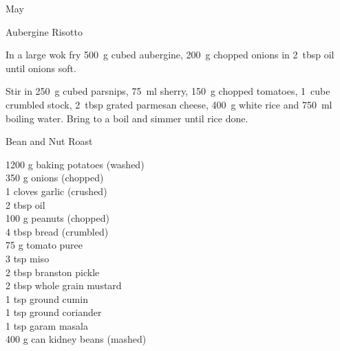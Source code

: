 \begin{menu}{May}
\begin{recipe}{2}{Aubergine Risotto}
\begin{ingredients}
		\end{ingredients}
	
	
    \begin{instructions}
    \item 
        In a large wok fry
        500~g cubed aubergine,
        200~g chopped onions
        in
        2~tbsp  oil
        until onions soft.
      \item 
        Stir in
        250~g cubed parsnips,
        75~ml  sherry,
        150~g chopped tomatoes,
        1~cube crumbled stock,
        2~tbsp grated parmesan cheese,
        400~g  white rice
        and
        750~ml  boiling water.
        Bring to a boil and simmer until rice done.
      
    \end{instructions}
    \end{recipe}%
  
    \begin{recipe}{2}{Bean and Nut Roast}%
		\begin{ingredients}
		1200 g baking potatoes (washed) \\
	350 g onions (chopped) \\
	1 cloves garlic (crushed) \\
	2 tbsp oil  \\
	100 g peanuts (chopped) \\
	4 tbsp bread (crumbled) \\
	75 g tomato puree  \\
	3 tsp miso  \\
	2 tbsp branston pickle  \\
	2 tbsp whole grain mustard  \\
	1 tsp ground cumin  \\
	1 tsp ground coriander  \\
	1 tsp garam masala  \\
	400 g can kidney beans (mashed) \\
	
		\end{ingredients}
	
	

\end{recipe}
\end{menu}
